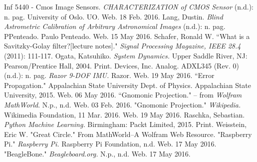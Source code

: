 \documentclass[12pt,a4paper]{book}
\begin{document}
\begin{thebibliography}{100}
Inf 5440 - Cmos Image Sensors. \textit{CHARACTERIZATION of CMOS Sensor} (n.d.): n. pag. University of Oslo. UO. Web. 18 Feb. 2016.
Lang, Dustin. \textit{Blind Astrometric Calibration of Arbitrary Astronomical Images} (n.d.): n. pag. PPenteado. Paulo Penteado. Web. 15 May 2016.
Schafer, Ronald W. ``What is a Savitzky-Golay filter?[lecture notes]." \textit{Signal Processing Magazine, IEEE 28.4} (2011): 111-117.
Ogata, Katsuhiko. \textit{System Dynamics.} Upper Saddle River, NJ: Pearson/Prentice Hall, 2004. Print.
Devices, Inc. Analog. ADXL345 (Rev. 0) (n.d.): n. pag. 
\textit{Razor 9-DOF IMU.} Razor. Web. 19 May 2016.
``Error Propagation." Appalachian State University Dept. of Physics. Appalachian State University, 2015. Web. 06 May 2016.
``Gnomonic Projection." -- from \textit{Wolfram MathWorld}. N.p., n.d. Web. 03 Feb. 2016.
"Gnomonic Projection." \textit{Wikipedia.} Wikimedia Foundation, 11 Mar. 2016. Web. 19 May 2016.
Raschka, Sebastian. \textit{Python Machine Learning.} Birmingham: Packt Limited, 2015. Print.
Weisstein, Eric W. "Great Circle." From MathWorld--A Wolfram Web Resource.
"Raspberry Pi." \textit{Raspberry Pi.} Raspberry Pi Foundation, n.d. Web. 17 May 2016.
"BeagleBone." \textit{Beagleboard.org.} N.p., n.d. Web. 17 May 2016.


\end{thebibliography}
\end{document}
